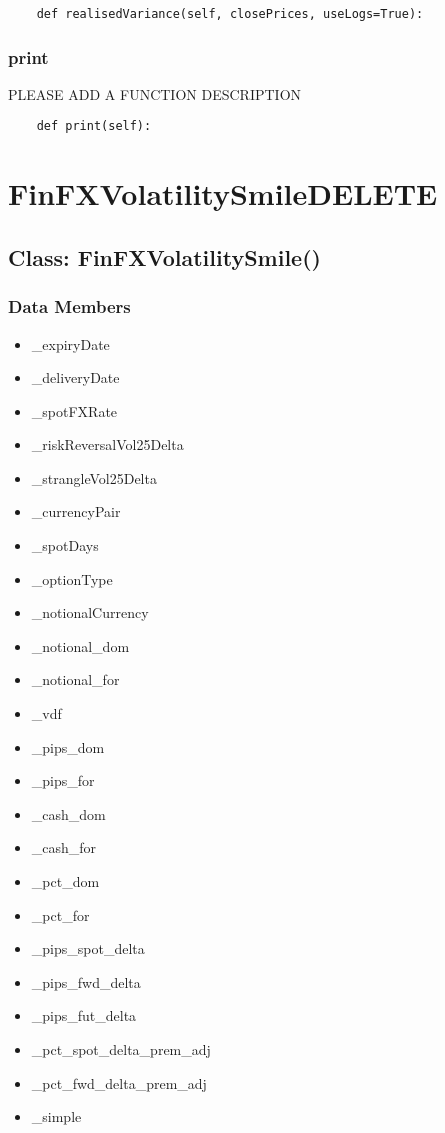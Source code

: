 \documentclass[twoside,11pt]{book}
\begin{document}
\begin{lstlisting}
    def realisedVariance(self, closePrices, useLogs=True):
\end{lstlisting}

\subsubsection*{{\bf print}}
PLEASE ADD A FUNCTION DESCRIPTION

\begin{lstlisting}
    def print(self):
\end{lstlisting}

\newpage
\section{FinFXVolatilitySmileDELETE}

\subsection*{Class: FinFXVolatilitySmile()}


\subsubsection*{Data Members}
\begin{itemize}
\item{\_expiryDate}
\item{\_deliveryDate}
\item{\_spotFXRate}
\item{\_riskReversalVol25Delta}
\item{\_strangleVol25Delta}
\item{\_currencyPair}
\item{\_spotDays}
\item{\_optionType}
\item{\_notionalCurrency}
\item{\_notional\_dom}
\item{\_notional\_for}
\item{\_vdf}
\item{\_pips\_dom}
\item{\_pips\_for}
\item{\_cash\_dom}
\item{\_cash\_for}
\item{\_pct\_dom}
\item{\_pct\_for}
\item{\_pips\_spot\_delta}
\item{\_pips\_fwd\_delta}
\item{\_pips\_fut\_delta}
\item{\_pct\_spot\_delta\_prem\_adj}
\item{\_pct\_fwd\_delta\_prem\_adj}
\item{\_simple}
\end{itemize}
\end{document}

